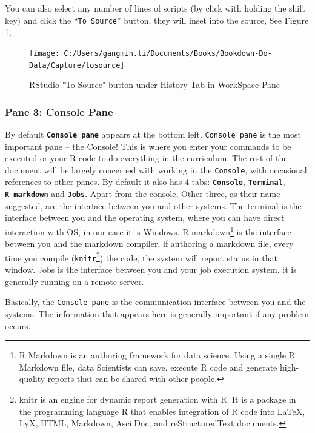 \documentclass[
]{book}
\begin{document}
You can also select any number of lines of scripts (by click with holding the shift key) and click the ``\texttt{To\ Source}'' button, they will inset into the source, See Figure \ref{fig:tosource},

\begin{figure}

{\centering \texttt{[image: C:/Users/gangmin.li/Documents/Books/Bookdown-Do-Data/Capture/tosource]} 

}

\caption{RStudio "To Source" button under History Tab in WorkSpace Pane}\label{fig:tosource}
\end{figure}

\hypertarget{pane-3-console-pane}{%
\subsubsection*{Pane 3: Console Pane}\label{pane-3-console-pane}}


By default \textbf{\texttt{Console\ pane}} appears at the bottom left. \texttt{Console\ pane} is the most important pane -- the Console! This is where you enter your commands to be executed or your R code to do everything in the curriculum. The rest of the document will be largely concerned with working in the \texttt{Console}, with occasional references to other panes.
By default it also has 4 tabs: \textbf{\texttt{Console}}, \textbf{\texttt{Terminal}}, \textbf{\texttt{R\ markdown}} and \textbf{\texttt{Jobs}}. Apart from the console, Other three, as their name suggested, are the interface between you and other systems. The terminal is the interface between you and the operating system, where you can have direct interaction with OS, in our case it is Windows. R markdown\footnote{R Markdown is an authoring framework for data science. Using a single R Markdown file, data Scientists can save, execute R code and generate high-quality reports that can be shared with other people.} is the interface between you and the markdown compiler, if authoring a markdown file, every time you compile (\texttt{knitr}\footnote{knitr is an engine for dynamic report generation with R. It is a package in the programming language R that enables integration of R code into LaTeX, LyX, HTML, Markdown, AsciiDoc, and reStructuredText documents.}) the code, the system will report status in that window. Jobs is the interface between you and your job execution system. it is generally running on a remote server.

Basically, the \texttt{Console\ pane} is the communication interface between you and the systems. The information that appears here is generally important if any problem occurs.
\end{document}
